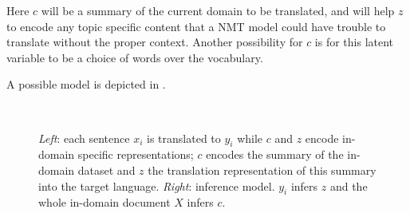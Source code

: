 
Here $c$ will be a summary of the current domain to be translated,
and will help $z$ to encode any topic specific content that a NMT
model could have trouble to translate without the proper context.
Another possibility for $c$ is for this latent variable to be a
choice of words over the vocabulary.

A possible model is depicted in .

\begin{figure}[t]
    \centering
    ~

    \caption{{\it Left}: each sentence $x_i$ is translated to $y_i$
        while $c$ and $z$ encode in-domain specific representations; $c$
        encodes the summary of the in-domain dataset and $z$ the
        translation representation of this summary into the target
        language.
            {\it Right}: inference model. $y_i$ infers $z$ and the whole
        in-domain document $X$ infers $c$.}
    \label{fig:indomainstatistician}
\end{figure}


